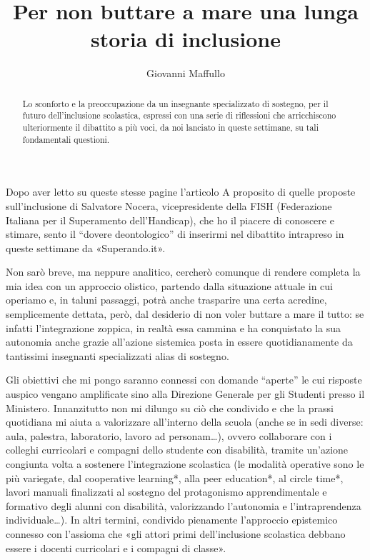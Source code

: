 \author{Giovanni Maffullo}
\title{Per non buttare a mare una lunga storia di inclusione }
\label{cha:maffullo100513}
\begin{abstract}
Lo sconforto e la preoccupazione da un insegnante specializzato di sostegno, per il futuro dell'inclusione scolastica, espressi con una serie di riflessioni che arricchiscono ulteriormente il dibattito a più voci, da noi lanciato in queste settimane, su tali fondamentali questioni. 
\end{abstract}
\maketitle
{}
Dopo aver letto su queste stesse pagine l'articolo A proposito di quelle proposte sull'inclusione\pageref{nocera020513} di Salvatore Nocera, vicepresidente della FISH (Federazione Italiana per il Superamento dell'Handicap), che ho il piacere di conoscere e stimare, sento il “dovere deontologico” di inserirmi nel dibattito intrapreso in queste settimane da «Superando.it».

Non sarò breve, ma neppure analitico, cercherò comunque di rendere completa la mia idea con un approccio olistico, partendo dalla situazione attuale in cui operiamo e, in taluni passaggi, potrà anche trasparire una certa acredine, semplicemente dettata, però, dal desiderio di non voler buttare a mare il tutto: se infatti l'integrazione zoppica, in realtà essa cammina e ha conquistato la sua autonomia anche grazie all'azione sistemica posta in essere quotidianamente da tantissimi insegnanti specializzati alias di sostegno.

Gli obiettivi che mi pongo saranno connessi con domande “aperte” le cui risposte auspico vengano amplificate sino alla Direzione Generale per gli Studenti presso il Ministero.
Innanzitutto non mi dilungo su ciò che condivido e che la prassi quotidiana mi aiuta a valorizzare all'interno della scuola (anche se in sedi diverse: aula, palestra, laboratorio, lavoro ad personam…), ovvero collaborare con i colleghi curricolari e compagni dello studente con disabilità, tramite un'azione congiunta volta a sostenere l'integrazione scolastica (le modalità operative sono le più variegate, dal cooperative learning*, alla peer education*, al circle time*, lavori manuali finalizzati al sostegno del protagonismo apprendimentale e formativo degli alunni con disabilità, valorizzando l'autonomia e l'intraprendenza individuale…). In altri termini, condivido pienamente l'approccio epistemico connesso con l'assioma che «gli attori primi dell'inclusione scolastica debbano essere i docenti curricolari e i compagni di classe».

